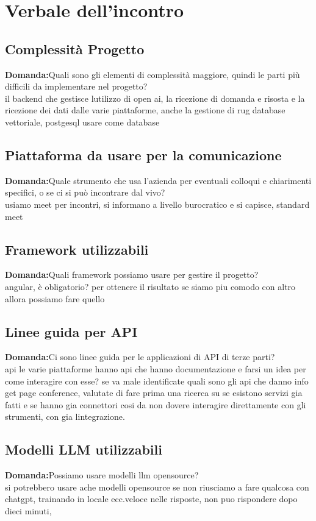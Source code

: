 \documentclass{article}
\begin{document}
\section{Verbale dell'incontro}
\subsection{Complessità Progetto}
\textbf{Domanda:}Quali sono gli elementi di complessità maggiore, quindi le parti più difficili da implementare nel progetto?\\
il backend che gestisce lutilizzo di open ai, la ricezione di domanda e risosta e la ricezione dei dati dalle
varie piattaforme, anche la gestione di rug database vettoriale, postgesql usare come database
\subsection{Piattaforma da usare per la comunicazione}
\textbf{Domanda:}Quale strumento che usa l’azienda per eventuali colloqui e chiarimenti specifici, o se ci si può incontrare dal vivo?\\
usiamo meet per incontri, si informano a livello burocratico e si capisce, standard meet
\subsection{Framework utilizzabili}
\textbf{Domanda:}Quali framework possiamo usare per gestire il progetto?\\
angular, è obligatorio? per ottenere il risultato se siamo piu comodo con altro allora possiamo fare quello
\subsection{Linee guida per API}
\textbf{Domanda:}Ci sono linee guida per le applicazioni di API di terze parti?\\
api le varie piattaforme hanno api che hanno documentazione e farsi un idea per come interagire con esse?
se va male identificate quali sono gli api che danno info  get page conference, valutate di fare prima una
ricerca su se esistono servizi gia fatti e se hanno gia connettori cosi da non dovere interagire direttamente con 
gli strumenti, con gia lintegrazione.
\subsection{Modelli LLM utilizzabili}
\textbf{Domanda:}Possiamo usare modelli llm opensource?\\
si potrebbero usare ache modelli opensource se non riusciamo a fare qualcosa con chatgpt, 
trainando in locale ecc.veloce nelle risposte, non puo rispondere dopo dieci minuti, 
\end{document}
